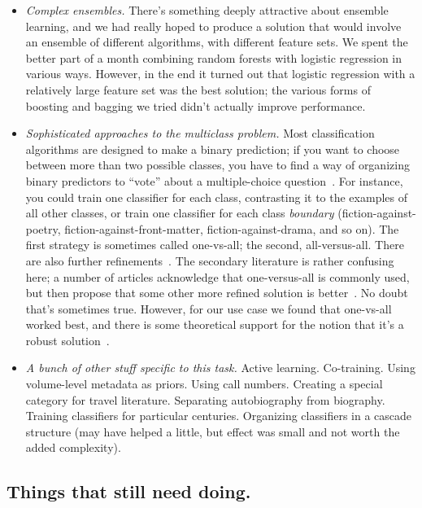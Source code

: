 \documentclass[paper=a4, fontsize=12pt]{scrartcl}
\numberwithin{equation}{section}		%
\numberwithin{figure}{section}			%
\numberwithin{table}{section}				%
\begin{document}
\begin{itemize}
\item \textit{Complex ensembles.} There's something deeply attractive about ensemble learning, and we had really hoped to produce a solution that would involve an ensemble of different algorithms, with different feature sets. We spent the better part of a month combining random forests with logistic regression in various ways. However, in the end it turned out that logistic regression with a relatively large feature set was the best solution; the various forms of boosting and bagging we tried didn't actually improve performance.

\item \textit{Sophisticated approaches to the multiclass problem.} Most classification algorithms are designed to make a binary prediction; if you want to choose between more than two possible classes, you have to find a way of organizing binary predictors to ``vote'' about a multiple-choice question~\cite{allwein:multiclass}. For instance, you could train one classifier for each class, contrasting it to the examples of all other classes, or train one classifier for each class \textit{boundary} (fiction-against-poetry, fiction-against-front-matter, fiction-against-drama, and so on). The first strategy is sometimes called one-vs-all; the second, all-versus-all. There are also further refinements~\cite{dieterrich:multiclass}. The secondary literature  is rather confusing here; a number of articles acknowledge that one-versus-all is commonly used, but then propose that some other more refined solution is better~\cite{allwein:multiclass}. No doubt that's sometimes true. However, for our use case we found that one-vs-all worked best, and there is some theoretical support for the notion that it's a robust solution~\cite{rifkin:multiclass}.

\item \textit{A bunch of other stuff specific to this task.} Active learning. Co-training. Using volume-level metadata as priors. Using call numbers. Creating a special category for travel literature. Separating autobiography from biography. Training classifiers for particular centuries. Organizing classifiers in a cascade structure (may have helped a little, but effect was small and not worth the added complexity).

\end{itemize}

\subsection{Things that still need doing.}
\end{document}
